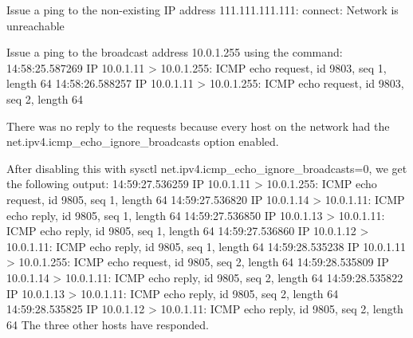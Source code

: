 Issue a ping to the non-existing IP address 111.111.111.111:
    connect: Network is unreachable

Issue a ping to the broadcast address 10.0.1.255 using the command:
    14:58:25.587269 IP 10.0.1.11 > 10.0.1.255: ICMP echo request, id 9803, seq 1, length 64
    14:58:26.588257 IP 10.0.1.11 > 10.0.1.255: ICMP echo request, id 9803, seq 2, length 64
    
    There was no reply to the requests because every host on the network had the net.ipv4.icmp_echo_ignore_broadcasts option enabled.

After disabling this with sysctl net.ipv4.icmp_echo_ignore_broadcasts=0, we get the following output:	  
	14:59:27.536259 IP 10.0.1.11 > 10.0.1.255: ICMP echo request, id 9805, seq 1, length 64
	14:59:27.536820 IP 10.0.1.14 > 10.0.1.11: ICMP echo reply, id 9805, seq 1, length 64
	14:59:27.536850 IP 10.0.1.13 > 10.0.1.11: ICMP echo reply, id 9805, seq 1, length 64
	14:59:27.536860 IP 10.0.1.12 > 10.0.1.11: ICMP echo reply, id 9805, seq 1, length 64
	14:59:28.535238 IP 10.0.1.11 > 10.0.1.255: ICMP echo request, id 9805, seq 2, length 64
	14:59:28.535809 IP 10.0.1.14 > 10.0.1.11: ICMP echo reply, id 9805, seq 2, length 64
	14:59:28.535822 IP 10.0.1.13 > 10.0.1.11: ICMP echo reply, id 9805, seq 2, length 64
	14:59:28.535825 IP 10.0.1.12 > 10.0.1.11: ICMP echo reply, id 9805, seq 2, length 64
The three other hosts have responded.
